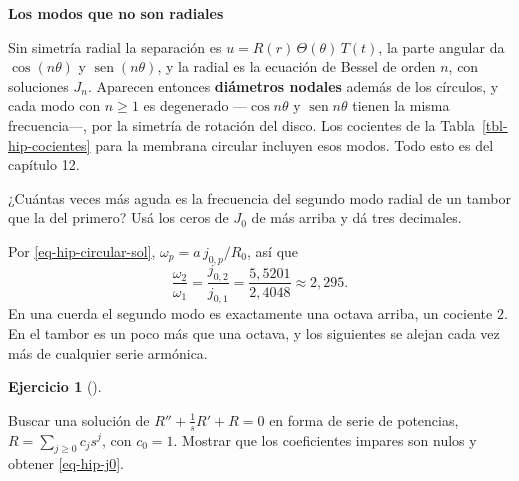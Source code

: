 \documentclass[
  spanish,
  a4paper,
]{scrbook}
\theoremstyle{definition}
\theoremstyle{plain}
\theoremstyle{definition}
\theoremstyle{plain}
\theoremstyle{definition}
\newtheorem{exercise}{Ejercicio}[chapter]
\theoremstyle{remark}
\begin{document}
\begin{tcolorbox}[enhanced jigsaw, arc=.35mm, bottomrule=.15mm, breakable, colback=white, colframe=quarto-callout-note-color-frame, left=2mm, leftrule=.75mm, opacityback=0, rightrule=.15mm, toprule=.15mm]
\begin{minipage}[t]{5.5mm}
\textcolor{quarto-callout-note-color}{\faInfo}
\end{minipage}%
\begin{minipage}[t]{\textwidth - 5.5mm}

\vspace{-3mm}\textbf{Los modos que no son radiales}\vspace{3mm}

Sin simetría radial la separación es \(u = R(r)\,\Theta(\theta)\,T(t)\),
la parte angular da \(\cos(n\theta)\) y \(\operatorname{sen}(n\theta)\),
y la radial es la ecuación de Bessel de orden \(n\), con soluciones
\(J_n\). Aparecen entonces \textbf{diámetros nodales} además de los
círculos, y cada modo con \(n\ge1\) es degenerado ---\(\cos n\theta\) y
\(\operatorname{sen}n\theta\) tienen la misma frecuencia---, por la
simetría de rotación del disco. Los cocientes de la
Tabla~\ref{tbl-hip-cocientes} para la membrana circular incluyen esos
modos. Todo esto es del capítulo 12.

\end{minipage}%
\end{tcolorbox}

¿Cuántas veces más aguda es la frecuencia del segundo modo radial de un
tambor que la del primero? Usá los ceros de \(J_0\) de más arriba y dá
tres decimales.

Por \ref{eq-hip-circular-sol}, \(\omega_p = a\,j_{0,p}/R_0\), así que
\[\frac{\omega_2}{\omega_1} = \frac{j_{0,2}}{j_{0,1}} = \frac{5{,}5201}{2{,}4048}\approx 2{,}295 .\]
En una cuerda el segundo modo es exactamente una octava arriba, un
cociente \(2\). En el tambor es un poco más que una octava, y los
siguientes se alejan cada vez más de cualquier serie armónica.

\begin{exercise}[]\protect\hypertarget{exr-hip-serie-j0}{}\label{exr-hip-serie-j0}

Buscar una solución de \(R'' + \tfrac1s R' + R = 0\) en forma de serie
de potencias, \(R = \sum_{j\ge0}c_js^j\), con \(c_0 = 1\). Mostrar que
los coeficientes impares son nulos y obtener \ref{eq-hip-j0}.

\end{exercise}
\end{document}

